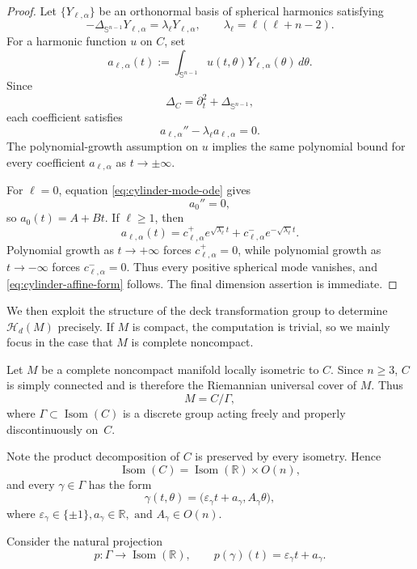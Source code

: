 \documentclass[12pt]{amsart}
\theoremstyle{plain}
\theoremstyle{definition}
\theoremstyle{remark}     %
\numberwithin{equation}{section}
\begin{document}
\begin{proof}
Let $\{Y_{\ell,\alpha}\}$ be an orthonormal basis of spherical harmonics satisfying
\[
    -\Delta_{\mathbb S^{n-1}}Y_{\ell,\alpha}
    =\lambda_\ell Y_{\ell,\alpha},
    \qquad
    \lambda_\ell=\ell(\ell+n-2).
\]
For a harmonic function $u$ on $C$, set
\[
    a_{\ell,\alpha}(t)
    :=\int_{\mathbb S^{n-1}}
      u(t,\theta)Y_{\ell,\alpha}(\theta)\,d\theta.
\]
Since
\[
    \Delta_C=\partial_t^2+\Delta_{\mathbb S^{n-1}},
\]
each coefficient satisfies
\begin{equation}\label{eq:cylinder-mode-ode}
    a_{\ell,\alpha}''-\lambda_\ell a_{\ell,\alpha}=0.
\end{equation}
The polynomial-growth assumption on $u$ implies the same polynomial bound
for every coefficient $a_{\ell,\alpha}$ as $t\to\pm\infty$.

For $\ell=0$, equation \cref{eq:cylinder-mode-ode} gives
\[
    a_{0}''=0,
\]
so $a_0(t)=A+Bt$.  If $\ell\geq1$, then
\[
    a_{\ell,\alpha}(t)
    =c_{\ell,\alpha}^{+}e^{\sqrt{\lambda_\ell}t}
     +c_{\ell,\alpha}^{-}e^{-\sqrt{\lambda_\ell}t}.
\]
Polynomial growth as $t\to+\infty$ forces
$c_{\ell,\alpha}^{+}=0$, while polynomial growth as $t\to-\infty$ forces
$c_{\ell,\alpha}^{-}=0$.  Thus every positive spherical mode vanishes, and
\cref{eq:cylinder-affine-form} follows.  The final dimension assertion is
immediate.
\end{proof}

We then exploit the structure of the deck transformation group to determine
$\mathcal H_d(M)$ precisely. If $M$ is compact, the computation is trivial, so we mainly focus in the case that $M$ is complete noncompact. 

Let $M$ be a complete noncompact
manifold locally isometric to $C$. Since $n\geq3$, $C$ is simply connected and is
therefore the Riemannian universal cover of $M$.  Thus
\[
M=C/\Gamma,
\]
where $\Gamma\subset \operatorname{Isom}(C)$ is a discrete group acting freely and
properly discontinuously on~$C$.

Note the product decomposition of $ C$ is preserved by every
isometry.  Hence
\[
\operatorname{Isom}( C)
=
\operatorname{Isom}(\mathbb R)\times O(n),
\]
and every $\gamma\in\Gamma$ has the form
\[
\gamma(t,\theta)
=
\bigl(\varepsilon_\gamma t+a_\gamma,
A_\gamma\theta\bigr),
\]
where $\varepsilon_\gamma\in\{\pm1\},
a_\gamma\in\mathbb R,\text{ and }
A_\gamma\in O(n)$.

Consider the natural projection
\[
p:\Gamma\longrightarrow\operatorname{Isom}(\mathbb R),
\qquad
p(\gamma)(t)=\varepsilon_\gamma t+a_\gamma.
\]
\end{document}
